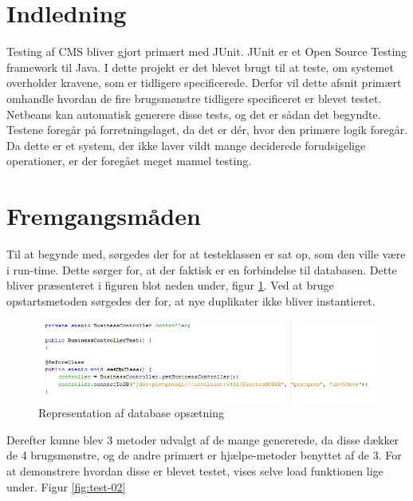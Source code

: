 
\section{Indledning}
Testing af CMS bliver gjort primært med JUnit. JUnit er et Open Source Testing framework til Java. I dette projekt er det blevet brugt til at teste, om systemet overholder kravene, som er tidligere specificerede.
Derfor vil dette afsnit primært omhandle hvordan de fire brugsmønstre tidligere specificeret er blevet testet. Netbeans kan automatisk generere disse tests, og det er sådan det begyndte. Testene foregår på forretningslaget, da det er dér, hvor den primære logik foregår. Da dette er et system, der ikke laver vildt mange deciderede forudsigelige operationer, er der foregået meget manuel testing. 
\section{Fremgangsmåden}
Til at begynde med, sørgedes der for at testeklassen er sat op, som den ville være i run-time. Dette sørger for, at der faktisk er en forbindelse til databasen. Dette bliver præsenteret i figuren blot neden under, figur \ref{fig:test-01}. Ved at bruge opstartsmetoden sørgedes der for, at nye duplikater ikke bliver instantieret.

\begin{figure}[ht]
  \includegraphics[width=\linewidth]{elaborationsdokumentet/figurer/test/test1.png}
  \caption{Representation af database opsætning}
  \label{fig:test-01}
\end{figure}
\FloatBarrier

Derefter kunne blev 3 metoder udvalgt af de mange genererede, da disse dækker de 4 brugsmønstre, og de andre primært er hjælpe-metoder benyttet af de 3.
For at demonstrere hvordan disse er blevet testet, vises selve load funktionen lige under. Figur \ref{fig:test-02}


